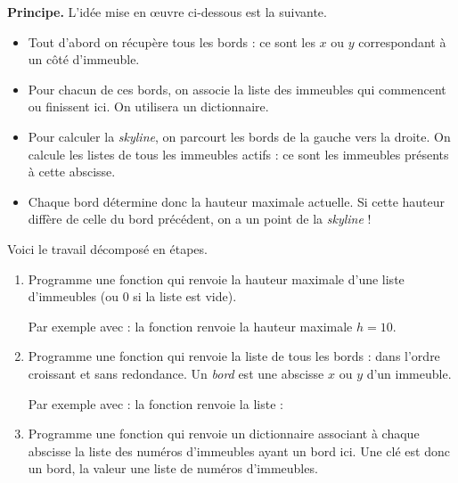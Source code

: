\documentclass[11pt,class=report,crop=false]{standalone}
\begin{document}
\begin{activite}[Skyline]
\begin{itemize}
\end{itemize}




\bigskip	

\textbf{Principe.} L'idée mise en \oe uvre ci-dessous est la suivante. 
\begin{itemize}
	\item Tout d'abord on récupère tous les bords : ce sont les $x$ ou $y$ correspondant à un côté d'immeuble. 
	
	\item Pour chacun de ces bords, on associe la liste des immeubles qui commencent ou finissent ici. On utilisera un dictionnaire.
	
	\item Pour calculer la \emph{skyline}, on parcourt les bords de la gauche vers la droite. On calcule les listes de tous les immeubles actifs : ce sont les immeubles présents à cette abscisse. 

	\item Chaque bord détermine donc la hauteur maximale actuelle. Si cette hauteur diffère de celle du bord précédent, on a un point de la \emph{skyline} !
	
\end{itemize}

\bigskip	

Voici le travail décomposé en étapes.

\begin{enumerate}
		
	\item Programme une fonction  qui renvoie la hauteur maximale d'une liste d'immeubles (ou $0$ si la liste est vide). 
	
	Par exemple avec :	
	la fonction renvoie la hauteur maximale $h=10$.
		
	\item Programme une fonction  qui renvoie la liste de tous les bords : dans l'ordre croissant et sans redondance. Un \emph{bord} est une abscisse $x$ ou $y$ d'un immeuble. 
	
	Par exemple avec :	
	la fonction renvoie la liste :	
	\mycenterline{\ci{[0, 1, 2, 3, 4, 5, 7, 8, 9]}}
	
	\item Programme une fonction  qui renvoie un dictionnaire associant à chaque abscisse la liste des numéros d'immeubles ayant un bord ici. Une clé est donc un bord, la valeur une liste de numéros d'immeubles.
	

\end{enumerate}
\end{activite}
\end{document}
